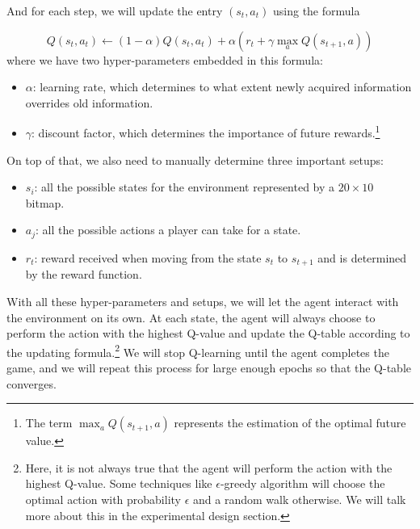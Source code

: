 \documentclass[letterpaper]{article} %
\begin{document}
And for each step, we will update the entry $(s_{t}, a_{t})$ using the formula

\[
    Q(s_{t},a_{t}) \leftarrow (1-\alpha) Q(s_{t},a_{t}) + \alpha   \left ( r_{t} + \gamma  \max_{a}Q(s_{t+1}, a)\right ) 
\]
where we have two hyper-parameters embedded in this formula:
\begin{itemize}
  \item $\alpha$: learning rate, which determines to what extent newly acquired information overrides old information.
  \item $\gamma$: discount factor, which determines the importance of future rewards.\footnote{The term $\max_{a}Q(s_{t+1}, a) $ represents the estimation of the optimal future value.}
\end{itemize}

On top of that, we also need to manually determine three important setups:
\begin{itemize}
  \item $s_{i}$: all the possible states for the environment represented by a $20\times 10$ bitmap.
  \item $a_{j}$: all the possible actions a player can take for a state.
  \item $r_{t}$: reward received when moving from the state $s_{t}$ to $s_{t+1}$ and is determined by the reward function.
\end{itemize}

With all these hyper-parameters and setups, we will let the agent interact with the environment on its own. At each state, the agent will always choose to perform the action with the highest Q-value and update the Q-table according to the updating formula.\footnote{Here, it is not always true that the agent will perform the action with the highest Q-value. Some techniques like $\epsilon$-greedy algorithm will choose the optimal action with probability $\epsilon$ and a random walk otherwise. We will talk more about this in the experimental design section.} We will stop Q-learning until the agent completes the game, and we will repeat this process for large enough epochs so that the Q-table converges.
\end{document}
